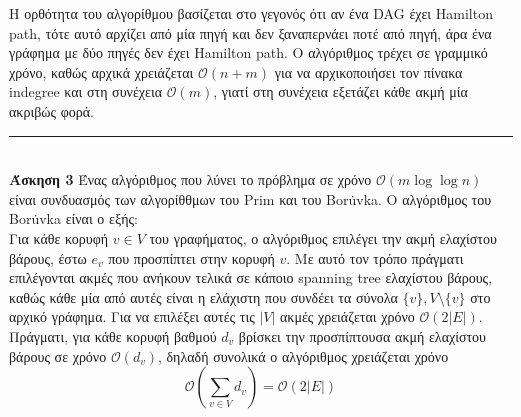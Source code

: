 \documentclass[12pt]{article}
\newcommand\en[1]{\latintext #1\greektext}
\newcommand\bigOh{\mathcal{O}}
\newcommand{\HRule}{\rule{\linewidth}{0.1mm}}
\begin{document}
Η ορθότητα του αλγορίθμου βασίζεται στο γεγονός ότι αν ένα \en{DAG} έχει \en{Hamilton path}, τότε αυτό αρχίζει από μία πηγή και δεν ξαναπερνάει ποτέ από πηγή, άρα ένα γράφημα με δύο πηγές δεν έχει \en{Hamilton path}. Ο αλγόριθμος τρέχει σε γραμμικό χρόνο, καθώς αρχικά χρειάζεται $\bigOh(n+m)$ για να αρχικοποιήσει τον πίνακα \en{indegree} και στη συνέχεια $\bigOh(m)$, γιατί στη συνέχεια εξετάζει κάθε ακμή μία ακριβώς φορά.\\
\HRule\\
{\bf Άσκηση 3} Ένας αλγόριθμος που λύνει το πρόβλημα σε χρόνο $\bigOh(m\log\log n)$ είναι συνδυασμός των αλγορίθθμων του \en{Prim} και του \en{Bor\.uvka}. Ο αλγόριθμος του \en{Bor\.uvka} είναι ο εξής:\\
Για κάθε κορυφή $v\in V$ του γραφήματος, ο αλγόριθμος επιλέγει την ακμή ελαχίστου βάρους, έστω $e_v$ που προσπίπτει στην κορυφή $v$. Με αυτό τον τρόπο πράγματι επιλέγονται ακμές που ανήκουν τελικά σε κάποιο \en{spanning tree} ελαχίστου βάρους, καθώς κάθε μία από αυτές είναι η ελάχιστη που συνδέει τα σύνολα $\{v\},V\setminus\{v\}$ στο αρχικό γράφημα. Για να επιλέξει αυτές τις $|V|$ ακμές χρειάζεται χρόνο $\bigOh(2|E|)$. Πράγματι, για κάθε κορυφή βαθμού $d_v$ βρίσκει την προσπίπτουσα ακμή ελαχίστου βάρους σε χρόνο $\bigOh(d_v)$, δηλαδή συνολικά ο αλγόριθμος χρειάζεται χρόνο
$$\bigOh\left(\sum_{v\in V}d_v\right)=\bigOh(2|E|)$$
\end{document}
